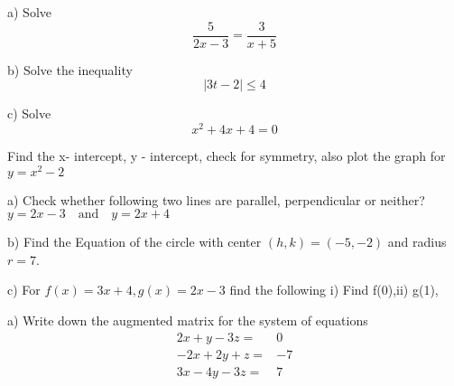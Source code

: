 \documentclass{exam}
\begin{document}
 
\begin{center}
\end{center}
 
\vspace{5mm}
 
 
\vspace{5mm}
 
 
\begin{questions}
	
	\question 
	\subitem a) Solve \quad \quad \quad  \hfill\enspace\hrulefill $$\frac{5}{2x-3}=\frac{3}{x+5}$$
	\vspace{5cm}
	
	\subitem b) Solve the inequality \quad \quad \quad  \hfill\enspace\hrulefill $$|3t-2|\leq 4$$
	\vspace{5cm}
	
	\subitem c) Solve \quad \quad \quad  \hfill\enspace\hrulefill $$x^2+4x+4=0$$
	\vspace{5cm}
	
	\question Find the x- intercept, y - intercept, check for symmetry, also plot the graph for   $y = x^2-2$
	\hfill\enspace\hrulefill
	\clearpage
	
	\question 
	\subitem a) Check whether following two lines are parallel, perpendicular or neither? \\ \(y=2x-3 \quad \mbox{and} \quad y=2x+4\) \hfill\enspace\hrulefill 
	\vspace{4cm}
	
	\subitem b) Find the Equation of the circle with center  \((h,k)=(-5,-2)\) and radius \(r=7\).
	\hfill\enspace\hrulefill 
	\vspace{6cm}
	
	\subitem c) For \(f(x)=3x+4, g(x)=2x-3\) find the following
	\subitem i) Find f(0),\quad  ii) g(1), 
	\hfill\enspace\hrulefill 
	\vspace{7cm}
	
	\question 
	\subitem a) Write down the augmented matrix for the system of equations
	\begin{align}
	\nonumber
	2x+y-3z=&0 \\ 
	\nonumber
   -2x+2y+z=&-7 \\ 
   \nonumber
	3x-4y-3z=&7  
	\end{align}
	 \vspace{6cm}
	


\end{questions}
\end{document}
